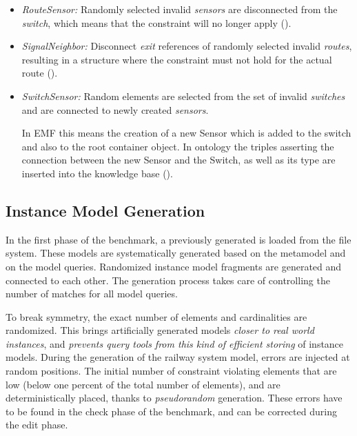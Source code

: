 \begin{itemize}
\begin{itemize}
    \item \emph{RouteSensor:} Randomly selected invalid \emph{sensors} are disconnected from the \emph{switch}, which means that the constraint will no longer apply ().
    
    \item  \emph{SignalNeighbor:} Disconnect \emph{exit} references of randomly selected invalid \emph{routes}, resulting in a structure where the constraint must not hold for the actual route ().
        
    \item \emph{SwitchSensor:} Random elements are selected from the set of invalid \emph{switches} and are connected to newly created \emph{sensors}.
    
    In EMF this means the creation of a new Sensor which is added to the switch and also to the root container object. In ontology the triples asserting the connection between the new Sensor and the Switch, as well as its type are inserted into the knowledge base ().
    
  \end{itemize}
\end{itemize}
 


\subsection{Instance Model Generation}
\label{sec:instanceGeneration}

In the first phase of the benchmark, a previously generated  is loaded from the file system. These models are systematically generated based on the metamodel and on the model queries. Randomized instance model fragments are generated and connected to each other. The generation process takes care of controlling the number of matches for all model queries.

To break symmetry, the exact number of elements and cardinalities are randomized. This brings artificially generated models \emph{closer to real world instances}, and \emph{prevents query tools from this kind of efficient storing} of instance models. During the generation of the railway system model, errors are injected at random positions. The initial number of constraint violating elements that are low (below one percent of the total number of elements), and are deterministically placed, thanks to \emph{pseudorandom} generation. These errors have to be found in the check phase of the benchmark, and can be corrected during the edit phase.

